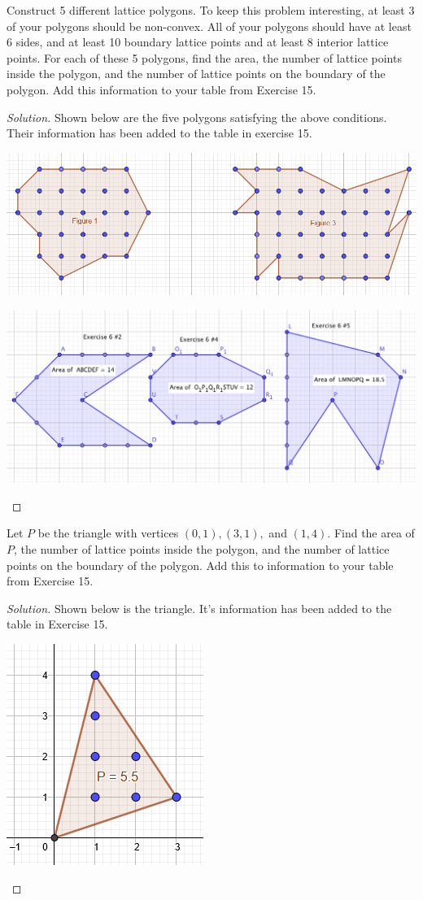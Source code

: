 \documentclass[12pt]{article}
\newenvironment{exercise}[2][Exercise]{\begin{trivlist}
        \item[\hskip \labelsep {\bfseries #1}\hskip \labelsep {\bfseries #2.}]}{\end{trivlist}}
\newenvironment{solution}
        {\begin{proof}[Solution]}
                    {\end{proof}}
\begin{document}
\begin{exercise}{16}
    Construct 5 different lattice polygons. To keep this problem interesting, at least 3 of your polygons should be non-convex. All of your polygons should have at least 6 sides, and at least 10 boundary lattice points and at least 8 interior lattice points. For each of these 5 polygons, find the area, the number of lattice points inside the polygon, and the number of lattice points on the boundary of the polygon. Add this information to your table from Exercise 15.
    \begin{solution}
        Shown below are the five polygons satisfying the above conditions. Their information has been added to the table in exercise 15.
        \begin{center}
            \includegraphics[width=.7\linewidth]{16-1}
        \end{center}
        \begin{center}
            \includegraphics[width=.7\linewidth]{16-2}
        \end{center}
    \end{solution}
\end{exercise}\pagebreak

\begin{exercise}{17}
    Let \( P \) be the triangle with vertices \( ( 0,1 ) , ( 3,1 ) , \) and \( ( 1,4 ) . \) Find the area of \( P \), the number of lattice points inside the polygon, and the number of lattice points on the boundary of the polygon. Add this to information to your table from Exercise 15.
    \begin{solution}
        Shown below is the triangle. It's information has been added to the table in Exercise 15.
        \begin{center}
            \includegraphics[width=.3\linewidth]{17}
        \end{center}
    \end{solution}
\end{exercise}
\end{document}

